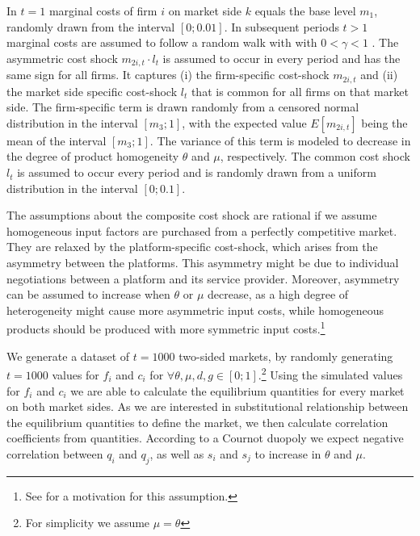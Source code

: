 \documentclass[12pt,a4paper,notitlepage]{article}
\begin{document}
In $t=1$ marginal costs of firm $i$ on market side $k$ equals the base level $m_1$, randomly drawn from the interval $[0;0.01]$. In subsequent periods $t>1$ marginal costs are assumed to follow a random walk with with $0<\gamma<1$ \citep[241]{harrington_detecting_2008}. The asymmetric cost shock $m_{2i,t} \cdot l_t$ is assumed to occur in every period and has the same sign for all firms. It captures (i) the firm-specific cost-shock $m_{2i,t}$ and (ii) the market side specific cost-shock $l_t$ that is common for all firms on that market side. The firm-specific term is drawn randomly from a censored normal distribution in the interval $[m_3;1]$, with the expected value $E[m_{2i,t}]$ being the mean of the interval $[m_3;1]$. The variance of this term is modeled to decrease in the degree of product homogeneity $\theta$ and $\mu$, respectively. The common cost shock $l_t$ is assumed to occur every period and is randomly drawn from a uniform distribution in the interval $[0;0.1]$.

The assumptions about the composite cost shock are rational if we assume homogeneous input factors are purchased from a perfectly competitive market. They are relaxed by the platform-specific cost-shock, which arises from the asymmetry between the platforms. This asymmetry might be due to individual negotiations between a platform and its service provider. Moreover, asymmetry can be assumed to increase when $\theta$ or $\mu$ decrease, as a high degree of heterogeneity might cause more asymmetric input costs, while homogeneous products should be produced with more symmetric input costs.\footnote{See \citep[17]{paha_empirical_2011} for a motivation for this assumption.} 

We generate a dataset of $t=1000$ two-sided markets, by randomly generating $t=1000$ values for $f_i$ and $c_i$ for $\forall \theta,\mu,d,g \in [0;1]$.\footnote{For simplicity we assume $\mu=\theta$} Using the simulated values for $f_i$ and $c_i$ we are able to calculate the equilibrium quantities for every market on both market sides. As we are interested in substitutional relationship between the equilibrium quantities to define the market, we then calculate correlation coefficients from quantities. According to a Cournot duopoly we expect negative correlation between $q_i$ and $q_j$, as well as $s_i$ and $s_j$ to increase in $\theta$ and $\mu$. 
\end{document}
